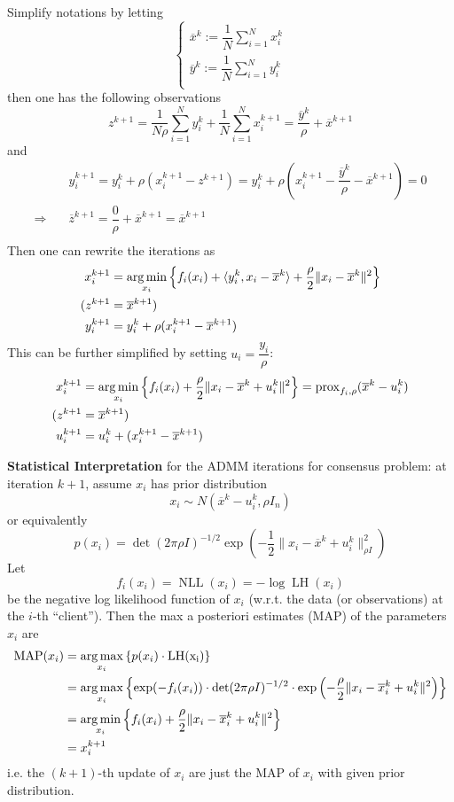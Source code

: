 Simplify notations by letting
$$
\begin{cases}
\overline{x}^k := \dfrac{1}{N} \sum\limits_{i=1}^N x_i^k \\
\overline{y}^k := \dfrac{1}{N} \sum\limits_{i=1}^N y_i^k \\
\end{cases}
$$
then one has the following observations
$$\displaystyle z^{k+1} = \dfrac{1}{N\rho} \sum\limits_{i=1}^N y_i^k + \dfrac{1}{N} \sum\limits_{i=1}^N x_i^{k+1} = \dfrac{\overline{y}^k}{\rho} + \overline{x}^{k+1}$$
and
\begin{align*}
    & y^{k+1}_i = y_i^k + \rho(x_i^{k+1}-z^{k+1}) = y_i^k + \rho(x_i^{k+1}-\dfrac{\overline{y}^k}{\rho} - \overline{x}^{k+1}) = 0 \\
    \Rightarrow \quad & \overline{z}^{k+1} = \dfrac{0}{\rho} + \overline{x}^{k+1} = \overline{x}^{k+1} \\
\end{align*}
Then one can rewrite the iterations as
\begin{align*}
x^{k+1}_i & = \operatorname*{arg\,min}\limits_{x_i} \left\{ f_i(x_i) + \langle y_i^k, x_i-\overline{x}^k \rangle + \dfrac{\rho}{2}\lVert x_i-\overline{x}^k \rVert^2 \right\} \\
(z^{k+1} & = \overline{x}^{k+1}) \\
y_i^{k+1} & = y_i^k + \rho(x^{k+1}_i-\overline{x}^{k+1})
\end{align*}
This can be further simplified by setting $u_i = \dfrac{y_i}{\rho}$:
\begin{align*}
x^{k+1}_i & = \operatorname*{arg\,min}\limits_{x_i} \left\{ f_i(x_i) + \dfrac{\rho}{2}\lVert x_i-\overline{x}^k + u_i^k \rVert^2 \right\} = \operatorname{prox}_{f_i,\rho}(\overline{x}^k - u_i^k) \\
(z^{k+1} & = \overline{x}^{k+1}) \\
u_i^{k+1} & = u_i^k + (x^{k+1}_i-\overline{x}^{k+1})
\end{align*}

{\bfseries Statistical Interpretation} for the ADMM iterations for consensus problem: at iteration $k+1$, assume $x_i$ has prior distribution
$$x_i \sim N(\overline{x}^k-u_i^k, \rho I_n)$$
or equivalently
$$p(x_i) = \det(2\pi\rho I)^{-1/2} \exp\left(-\dfrac{1}{2} \lVert x_i - \overline{x}^k + u_i^k \rVert_{\rho I}^2 \right)$$
Let
$$f_i(x_i) = \operatorname{NLL}(x_i) = -\log\operatorname{LH}(x_i)$$
be the negative log likelihood function of $x_i$ (w.r.t. the data (or observations) at the $i$-th ``client''). Then the max a posteriori estimates (MAP) of the parameters $x_i$ are
\begin{align*}
    \operatorname{MAP}(x_i) & = \operatorname*{arg\,max}_{x_i} \left\{ p(x_i) \cdot \operatorname{LH(x_i)} \right\} \\
    & = \operatorname*{arg\,max}_{x_i} \left\{ \exp(-f_i(x_i)) \cdot \det(2\pi\rho I)^{-1/2} \cdot \exp\left( -\dfrac{\rho}{2} \lVert x_i - \overline{x}_i^k + u_i^k \rVert^2 \right) \right\} \\
    & = \operatorname*{arg\,min}_{x_i} \left\{ f_i(x_i) + \dfrac{\rho}{2} \lVert x_i - \overline{x}_i^k + u_i^k \rVert^2 \right\} \\
    & = x_i^{k+1}
\end{align*}
i.e. the $(k+1)$-th update of $x_i$ are just the MAP of $x_i$ with given prior distribution.


